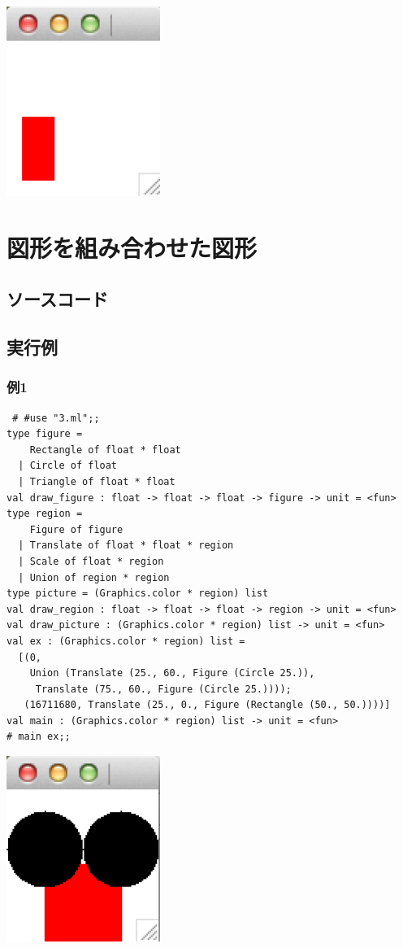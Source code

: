 \documentclass[a4paper,9pt]{jsarticle}
\begin{document}
\includegraphics[width=5cm]{2_3.png}

\newpage
\section{図形を組み合わせた図形}
\subsection{ソースコード}



\subsection{実行例}
\subsubsection{例1}
\begin{lstlisting}
 # #use "3.ml";;
type figure =
    Rectangle of float * float
  | Circle of float
  | Triangle of float * float
val draw_figure : float -> float -> float -> figure -> unit = <fun>
type region =
    Figure of figure
  | Translate of float * float * region
  | Scale of float * region
  | Union of region * region
type picture = (Graphics.color * region) list
val draw_region : float -> float -> float -> region -> unit = <fun>
val draw_picture : (Graphics.color * region) list -> unit = <fun>
val ex : (Graphics.color * region) list =
  [(0,
    Union (Translate (25., 60., Figure (Circle 25.)),
     Translate (75., 60., Figure (Circle 25.))));
   (16711680, Translate (25., 0., Figure (Rectangle (50., 50.))))]
val main : (Graphics.color * region) list -> unit = <fun>
# main ex;;
\end{lstlisting}
\includegraphics[width=5cm]{3_1.png}
\end{document}
